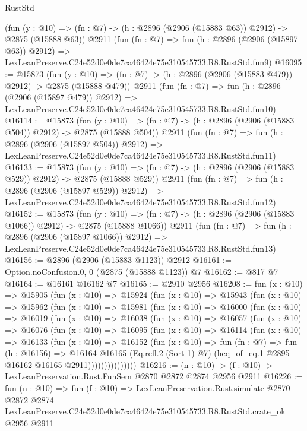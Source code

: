 \begin{lexlean}{RustStd}
\begin{coremodule}
    (fun (y : @10) => (fn : @7) -> (h : @2896 (@2906 (@15883 @63)) @2912) -> @2875 (@15888 @63))
    @2911
    (fun (fn : @7) =>
    fun (h : @2896 (@2906 (@15897 @63)) @2912) =>
    LexLeanPreserve.C24e52d0e0de7ca46424e75e310545733.R8.RustStd.fun9)
@16095 := @15873
    (fun (y : @10) => (fn : @7) -> (h : @2896 (@2906 (@15883 @479)) @2912) -> @2875 (@15888 @479))
    @2911
    (fun (fn : @7) =>
    fun (h : @2896 (@2906 (@15897 @479)) @2912) =>
    LexLeanPreserve.C24e52d0e0de7ca46424e75e310545733.R8.RustStd.fun10)
@16114 := @15873
    (fun (y : @10) => (fn : @7) -> (h : @2896 (@2906 (@15883 @504)) @2912) -> @2875 (@15888 @504))
    @2911
    (fun (fn : @7) =>
    fun (h : @2896 (@2906 (@15897 @504)) @2912) =>
    LexLeanPreserve.C24e52d0e0de7ca46424e75e310545733.R8.RustStd.fun11)
@16133 := @15873
    (fun (y : @10) => (fn : @7) -> (h : @2896 (@2906 (@15883 @529)) @2912) -> @2875 (@15888 @529))
    @2911
    (fun (fn : @7) =>
    fun (h : @2896 (@2906 (@15897 @529)) @2912) =>
    LexLeanPreserve.C24e52d0e0de7ca46424e75e310545733.R8.RustStd.fun12)
@16152 := @15873
    (fun (y : @10) => (fn : @7) -> (h : @2896 (@2906 (@15883 @1066)) @2912) -> @2875 (@15888 @1066))
    @2911
    (fun (fn : @7) =>
    fun (h : @2896 (@2906 (@15897 @1066)) @2912) =>
    LexLeanPreserve.C24e52d0e0de7ca46424e75e310545733.R8.RustStd.fun13)
@16156 := @2896 (@2906 (@15883 @1123)) @2912
@16161 := Option.noConfusion.{0, 0} (@2875 (@15888 @1123)) @7
@16162 := @817 @7
@16164 := @16161 @16162 @7
@16165 := @2910 @2956
@16208 := fun (x : @10) =>
  @15905
    (fun (x : @10) =>
    @15924
      (fun (x : @10) =>
      @15943
        (fun (x : @10) =>
        @15962
          (fun (x : @10) =>
          @15981
            (fun (x : @10) =>
            @16000
              (fun (x : @10) =>
              @16019
                (fun (x : @10) =>
                @16038
                  (fun (x : @10) =>
                  @16057
                    (fun (x : @10) =>
                    @16076
                      (fun (x : @10) =>
                      @16095
                        (fun (x : @10) =>
                        @16114
                          (fun (x : @10) =>
                          @16133
                            (fun (x : @10) =>
                            @16152
                              (fun (x : @10) =>
                              fun (fn : @7) =>
                              fun (h : @16156) =>
                              @16164
                                @16165
                                (Eq.refl.{2} (Sort 1) @7)
                                (heq_of_eq.{1} @2895 @16162 @16165 @2911)))))))))))))))
@16216 := (n : @10) -> (f : @10) -> LexLeanPreservation.Rust.FunSem @2870 @2872 @2874 @2956 @2911
@16226 := fun (n : @10) =>
  fun (f : @10) =>
  LexLeanPreservation.Rust.simulate
    @2870
    @2872
    @2874
    LexLeanPreserve.C24e52d0e0de7ca46424e75e310545733.R8.RustStd.crate_ok
    @2956
    @2911
\end{coremodule}
\end{lexlean}
